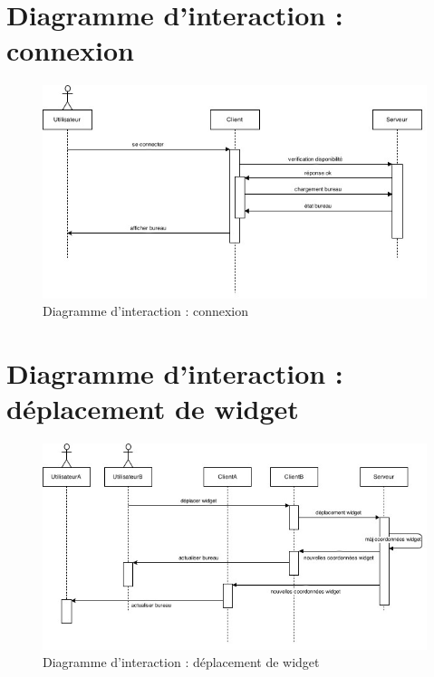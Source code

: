 \section{Diagramme d'interaction : connexion}
\begin{figure}[H]
	\centering
	\includegraphics[angle=90]{diagrammes/DI1.jpg}
	\caption{Diagramme d'interaction : connexion}
\end{figure}

\section{Diagramme d'interaction : déplacement de widget}
\begin{figure}[H]
	\centering
	\includegraphics[angle=90]{diagrammes/DI2.jpg}
	\caption{Diagramme d'interaction : déplacement de widget}
\end{figure}

